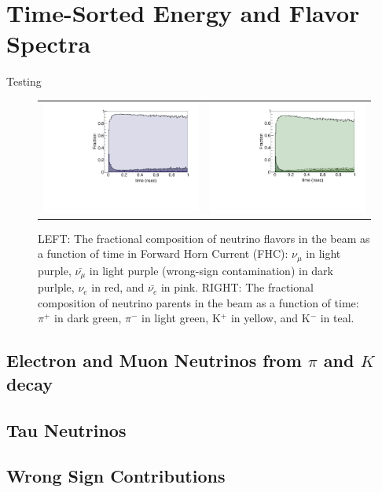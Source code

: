 %
%
\section{Time-Sorted Energy and Flavor Spectra}
\label{time_sorted_spectra}

Testing

\begin{figure}[ht]
	\begin{center}
           	\begin{tabular}{c c}
            \includegraphics[width=0.48\linewidth]{Figures/NuFlava.pdf} &
            \includegraphics[width=0.48\linewidth]{Figures/NuParent.pdf} \\
			\end{tabular}
	\end{center}
	\caption{LEFT: The fractional composition of neutrino flavors in the beam as a function of time in Forward Horn Current (FHC): $\nu_{\mu}$ in light purple, $\bar{\nu_{\mu}}$ in light purple (wrong-sign contamination) in dark purlple, $\nu_{e}$ in red, and $\bar{\nu_{e}}$ in pink. RIGHT: The fractional composition of neutrino parents in the beam as a function of time: $\pi^{+}$ in dark green, $\pi^{-}$ in light green, K$^+$ in yellow, and K$^-$ in teal.}
	\label{fig:flavorandparentfrac}
\end{figure}


\subsection{Electron and Muon Neutrinos from $\pi$ and $K$ decay}
\label{mu_e}

\subsection{Tau Neutrinos}
\label{taus}

\subsection{Wrong Sign Contributions}
\label{wrong_sign}


%
